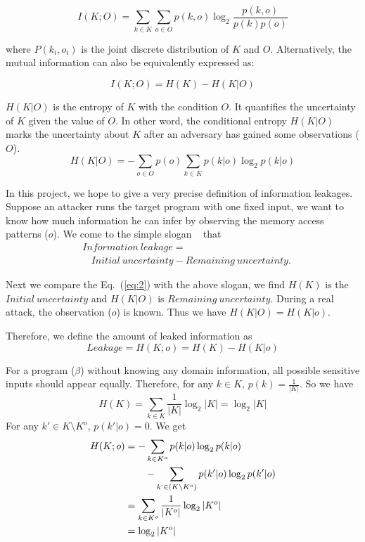 \begin{equation} \label{eq:1}
    I(K;O) = \sum_{k {\in} K}{\sum_{o {\in} O}{p(k, o)\log_2\frac{p(k, o)}{p(k)p(o)}}}
\end{equation}

where $P(k_i, o_i)$ is the joint discrete distribution of $K$ and $O$.
Alternatively, the mutual information can also be equivalently expressed as:

\begin{equation} \label{eq:2}
    I(K;O) = H(K) - H(K|O)
\end{equation}

$H(K|O)$ is the entropy of $K$ with the condition $O$. It quantifies the
uncertainty of $K$ given the value of $O$. In other word, the conditional
entropy $H(K|O)$ marks the uncertainty about $K$ after an adversary has gained
some observations ($O$).
\begin{equation}
    H(K|O) = - \sum_{o {\in} O} {p(o) \sum_{k {\in} K}{p(k|o)\log_2p(k|o)}}
\end{equation}

In this project, we hope to give a very precise definition of information
leakages. Suppose an attacker runs the target program with one
fixed input, we want to know how much information he can infer by observing the
memory access patterns ($o$). We come to the simple slogan
~\cite{10.1007/978-3-642-00596-1_21} %
that
\begin{align*}
     & \mathit{Information\ leakage} =                                         \\
     & ~~~~ \mathit{Initial\ uncertainty} - \mathit{Remaining\ uncertainty}.
\end{align*}

Next we compare the Eq.~(\ref{eq:2}) with the above slogan, we find $H(K)$
is the $\mathit{Initial\ uncertainty}$ and $H(K|O)$ is $\mathit{Remaining\
uncertainty}$. During a real attack, the observation ($o$) is known.  Thus we
have $H(K|O) = H(K|o)$.

Therefore, we define the amount of leaked information as
\begin{displaymath}
    Leakage = H(K;o) = H(K) - H(K|o)
\end{displaymath}

For a program ($\beta$) without knowing any domain information, all possible sensitive
inputs should appear equally. Therefore, for any $k \in K$, $p(k) =
\frac{1}{|K|}$. So we have
$$H(K) = \sum_{k {\in} K}\frac{1}{|K|}\log_2{|K|} = \log_2{|K|}$$
For any $k' \in K \setminus K^o$, $p(k'|o) = 0$. We get
\begin{align*}
    H(K;o) & = - \sum_{k {\in} K^o}{p(k|o)\log_2p(k|o)}                         \\
           & \qquad   - \sum_{k` {\in} (K \setminus K^o)}{p(k'|o)\log_2p(k'|o)} \\
           & = \sum_{k {\in} K^o}\frac{1}{|K^o|}\log_2{|K^o|}                   \\
           & = \log_2{|K^o|}
\end{align*}


